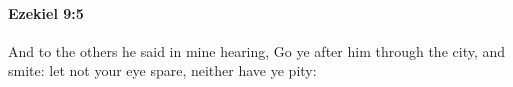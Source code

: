 
		\paragraph{Ezekiel 9:5} %
			\label{EZEKIEL-9-5}

			And to the others he said in mine hearing, Go ye after him through the city, and smite: let not your eye spare, neither have ye pity:


